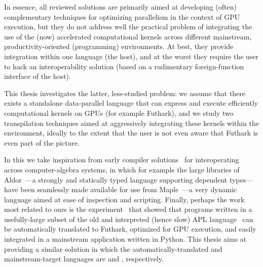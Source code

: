 %

In essence, all reviewed solutions are primarily aimed at developing (often) 
complementary techniques for optimizing parallelism in the context of GPU 
execution, but they do not address well the practical problem of integrating 
the use of the (now) accelerated computational kernels across different 
mainstream, productivity-oriented (programming) environments.
At best, they provide integration within one language (the host), 
and at the worst they require the user to hack an interoperability 
solution (based on a rudimentary foreign-function interface of the host). 


This thesis investigates the latter, less-studied problem: we assume that
there exists a standalone data-parallel language that can express and 
execute efficiently computational kernels on GPUs (for example Futhark), and 
we study two transpilation techniques aimed at aggressively integrating
these kernels within the \fsharp{} environment, ideally to the extent that
the user is not even aware that Futhark is even part of the picture.

In this we take inspiration from early compiler 
solutions~\cite{alma:ISSAC,mapal_synasc} for interoperating
across computer-algebra systems, in which for example
the large libraries of Aldor~\cite{aldor}---a strongly and statically typed 
language supporting dependent types---have been seamlessly made available 
for use from Maple~\cite{maple_guide}---a very dynamic language aimed at 
ease of inspection and scripting.
%
Finally, perhaps the work most related to ours
is the experiment~\cite{apltail} that showed that programs 
written in a usefully-large subset of the old and interpreted (hence slow) APL 
language~\cite{dyalogbook} can be automatically translated to Futhark, 
optimized for GPU execution, and easily integrated in a mainstream application
written in Python. This thesis aims at providing a similar solution in which
the automatically-translated and mainstream-target languages are \fsharp{}
and \csharp{}, respectively.

